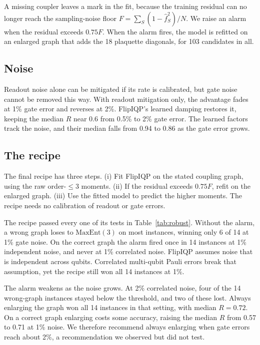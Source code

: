 \documentclass[aps,pra,twocolumn,superscriptaddress,nofootinbib]{revtex4-2}
\newcommand{\ME}{\mathrm{MaxEnt}(3)}
\begin{document}
A missing coupler leaves a mark in the fit, because the training residual can no longer reach the sampling-noise
floor $F=\sum_S(1-\hat f_S^2)/N$.
We raise an alarm when the residual exceeds $0.75F$.
When the alarm fires, the model is refitted on an enlarged graph that adds the 18 plaquette diagonals, for 103
candidates in all.

\subsection{Noise}

Readout noise alone can be mitigated if its rate is calibrated, but gate noise cannot be removed this way.
With readout mitigation only, the advantage fades at 1\% gate error and reverses at 2\%.
FlipIQP's learned damping restores it, keeping the median $R$ near 0.6 from 0.5\% to 2\% gate error.
The learned factors track the noise, and their median falls from 0.94 to 0.86 as the gate error grows.

\subsection{The recipe}

The final recipe has three steps.
(i) Fit FlipIQP on the stated coupling graph, using the raw order-$\le3$ moments.
(ii) If the residual exceeds $0.75F$, refit on the enlarged graph.
(iii) Use the fitted model to predict the higher moments.
The recipe needs no calibration of readout or gate errors.

The recipe passed every one of its tests in Table~\ref{tab:robust}.
Without the alarm, a wrong graph loses to $\ME$ on most instances, winning only 6 of 14 at 1\% gate noise.
On the correct graph the alarm fired once in 14 instances at 1\% independent noise, and never at 1\% correlated noise.
FlipIQP assumes noise that is independent across qubits.
Correlated multi-qubit Pauli errors break that assumption, yet the recipe still won all 14 instances at 1\%.

The alarm weakens as the noise grows.
At 2\% correlated noise, four of the 14 wrong-graph instances stayed below the threshold, and two of these lost.
Always enlarging the graph won all 14 instances in that setting, with median $R=0.72$.
On a correct graph enlarging costs some accuracy, raising the median $R$ from 0.57 to 0.71 at 1\% noise.
We therefore recommend always enlarging when gate errors reach about 2\%, a recommendation we observed but did not
test.
\end{document}
